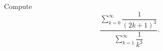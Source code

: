 Compute
\[
\dfrac{\displaystyle\sum_{k=0}^{\infty}\dfrac{1}{(2k+1)^3}}{\displaystyle\sum_{k=1}^{\infty}\dfrac{1}{k^3}}.
\]
